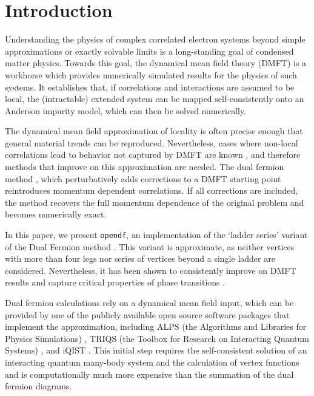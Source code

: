 \documentclass[3p,times,procedia]{elsarticle}
\begin{document}
\vspace*{-8pt}

\section{Introduction}

Understanding the physics of complex correlated electron systems beyond simple approximations or exactly solvable limits is a long-standing goal of condensed matter physics. Towards this goal, the dynamical mean field theory (DMFT) \cite{MetznerVollhardt:1989,MH89,Georges92,Jarrell92,Georges1996,KotliarSavrasov:2006} is a workhorse which provides numerically simulated results for the physics of such systems. It establishes that, if correlations and interactions are assumed to be local, the (intractable) extended system can be mapped self-consistently onto an  Anderson impurity model, which can then be solved numerically.

The dynamical mean field approximation of locality is often precise enough that general material trends can be reproduced. Nevertheless, cases where non-local correlations lead to behavior not captured by DMFT are known \cite{Lichtenstein2000,MaierJarrell:2005,Held2008,Fuchs2011}, and therefore methods that improve on this approximation are needed. The dual fermion method \cite{Rubtsov2008}, which perturbatively adds corrections to a DMFT starting point reintroduces momentum dependent correlations. If all corrections are included, the method recovers the full momentum dependence of the original problem and becomes numerically exact.

In this paper, we present \texttt{opendf}, an implementation of the `ladder series' variant of the Dual Fermion method \cite{HafermannLi:2009}. This variant is approximate, as neither vertices with more than four legs nor series of vertices beyond a single ladder are considered. Nevertheless, it has been shown to consistently improve on DMFT results \cite{Rubtsov2008,Brener2008,HafermannLi:2009,AntipovRubtsov:2011,Li2014,Otsuki2014} and capture critical properties of phase transitions \cite{Antipov2014}.

Dual fermion calculations rely on a dynamical mean field input, which can be provided by one of the publicly available open source software packages that implement the approximation, including ALPS (the Algorithms and Libraries for Physics Simulations) \cite{ALPS2}, TRIQS (the Toolbox for Research on Interacting Quantum Systems) \cite{TRIQS}, and iQIST \cite{iQIST}.
This initial step requires the self-consistent solution of an interacting quantum many-body system and the calculation of vertex functions \cite{Hafermann2013a,Gull2008b} and is computationally much more expensive than the summation of the dual fermion diagrams. 
\end{document}

